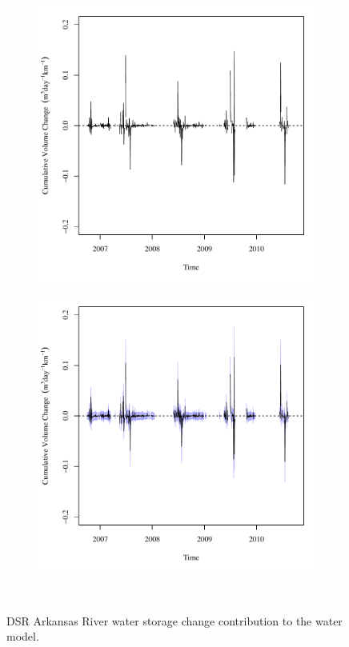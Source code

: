 \begin{figure}[htbp]
	\centering
	\begin{subfigure}{0.5\textwidth}
		\centering
		\includegraphics[width=0.9\linewidth]{"Figures/Results_DSR/Deterministic/Balance Water - storage"}
	\end{subfigure}%
	\begin{subfigure}{0.5\textwidth}
		\centering
		\includegraphics[width=0.9\linewidth]{"Figures/Results_DSR/Stochastic/Balance Water - storage"}
	\end{subfigure}\\
	\caption[DSR Arkansas River water storage change contribution to the water model.]{DSR Arkansas River water storage change contribution to the water model.}
	\label{fig:DSRWaterStore}
\end{figure}

